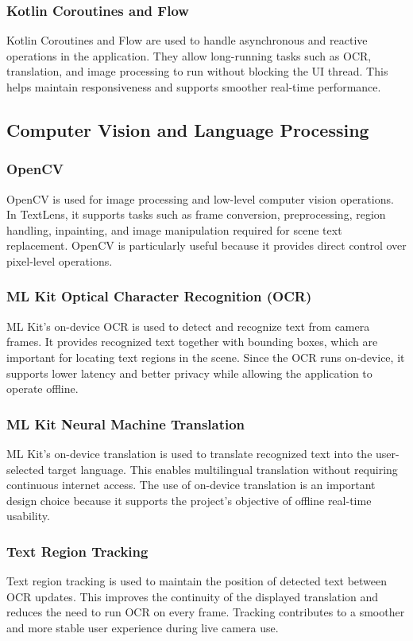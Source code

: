 \subsubsection{Kotlin Coroutines and Flow}
Kotlin Coroutines and Flow are used to handle asynchronous and reactive operations in the application. They allow long-running tasks such as OCR, translation, and image processing to run without blocking the UI thread. This helps maintain responsiveness and supports smoother real-time performance.

\subsection{Computer Vision and Language Processing}

\subsubsection{OpenCV}
OpenCV is used for image processing and low-level computer vision operations. In TextLens, it supports tasks such as frame conversion, preprocessing, region handling, inpainting, and image manipulation required for scene text replacement. OpenCV is particularly useful because it provides direct control over pixel-level operations.

\subsubsection{ML Kit Optical Character Recognition (OCR)}
ML Kit's on-device OCR is used to detect and recognize text from camera frames. It provides recognized text together with bounding boxes, which are important for locating text regions in the scene. Since the OCR runs on-device, it supports lower latency and better privacy while allowing the application to operate offline.

\subsubsection{ML Kit Neural Machine Translation}
ML Kit's on-device translation is used to translate recognized text into the user-selected target language. This enables multilingual translation without requiring continuous internet access. The use of on-device translation is an important design choice because it supports the project's objective of offline real-time usability.

\subsubsection{Text Region Tracking}
Text region tracking is used to maintain the position of detected text between OCR updates. This improves the continuity of the displayed translation and reduces the need to run OCR on every frame. Tracking contributes to a smoother and more stable user experience during live camera use.

